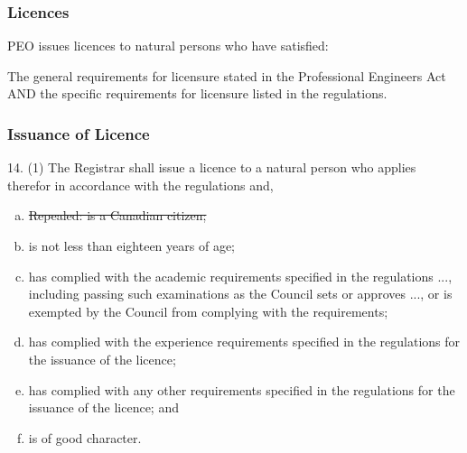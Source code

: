 \begin{frame}
\frametitle{Licences}

PEO issues licences to natural persons who have satisfied:

The general requirements for licensure stated in the Professional Engineers Act AND the specific requirements for licensure listed in the regulations.

\end{frame}




\begin{frame}
\frametitle{Issuance of Licence}

14.  (1)  The Registrar shall issue a licence to a natural person who applies therefor in accordance with the regulations and,
\begin{enumerate}[(a)]
\item		\sout{Repealed:  is a Canadian citizen;}\\
\item	is not less than eighteen years of age;\\
\item	has complied with the academic requirements specified in
		the regulations ..., including passing such examinations as
		the Council sets or approves ..., or is exempted by the
		Council from complying with the requirements;\\
\item	has complied with the experience requirements specified in
		the regulations for the issuance of the licence;\\
\item	has complied with any other requirements specified in the
		regulations for the issuance of the licence; and\\
\item	is of good character.
\end{enumerate}
\end{frame}




